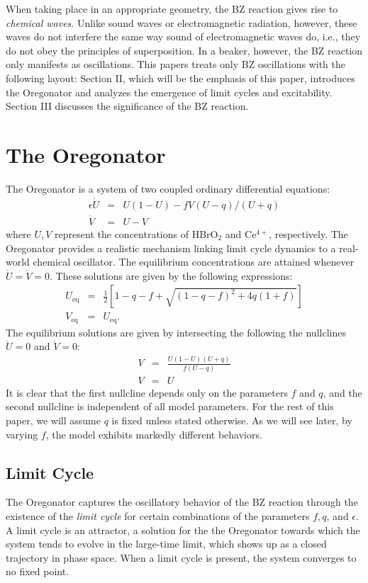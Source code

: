 \documentclass[twocolumn,amsmath,amssymb,aps]{revtex4}
\begin{document}
When taking place in an appropriate geometry, the BZ reaction gives rise to \textit{chemical waves}. Unlike sound waves or electromagnetic radiation, however, these waves do not interfere the same way sound of electromagnetic waves do, i.e., they do not obey the principles of superposition. In a beaker, however, the BZ reaction only manifests as oscillations. This papers treats only BZ oscillations with the following layout: Section II, which will be the emphasis of this paper, introduces the Oregonator and analyzes the emergence of limit cycles and excitability. Section III discusses the significance of the BZ reaction.

\section{The Oregonator}
The Oregonator is a system of two coupled ordinary differential equations:
\begin{eqnarray}
\epsilon \dot{U} &=& U(1-U) - fV(U-q)/(U+q) \\
\dot{V} &=&  U-V
\end{eqnarray}
where $U,V$ represent the concentrations of HBrO$_2$ and Ce$^{4+}$, respectively. The Oregonator provides a realistic mechanism linking limit cycle dynamics to a real-world chemical oscillator. The equilibrium concentrations are attained whenever $\dot{U} = \dot{V} = 0$. These solutions are given by the following expressions:
\begin{eqnarray}
U_{\text{eq}} &=& \frac{1}{2}\left[1-q-f + \sqrt{(1-q-f)^2 + 4q(1+f)}\right]\nonumber \\ 
V_{\text{eq}} &=& U_{\text{eq}}. 
\end{eqnarray}
The equilibrium solutions are given by intersecting the following the nullclines $\dot{U} = 0$ and $\dot{V} = 0$:
\begin{eqnarray} 
V &=& \frac{U(1-U)(U+q)}{f(U-q)}\\
V &=&U 
\end{eqnarray}
It is clear that the first nullcline depends only on the parameters $f$ and $q$, and the second nullcline is independent of all model parameters. For the rest of this paper, we will assume $q$ is fixed unless stated otherwise. As we will see later, by varying $f$, the model exhibits markedly different behaviors. 

\subsection{Limit Cycle}
The Oregonator captures the oscillatory behavior of the BZ reaction through the existence of the \textit{limit cycle} for certain combinations of the parameters $f,q$, and $\epsilon$. A limit cycle is an attractor, a solution for the the Oregonator towards which the system tends to evolve in the large-time limit, which shows up as a closed trajectory in phase space. When a limit cycle is present, the system converges to no fixed point. 
\end{document}
